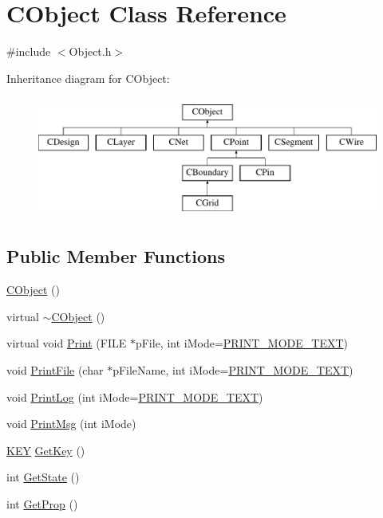 \hypertarget{classCObject}{}\section{C\+Object Class Reference}
\label{classCObject}


{\ttfamily \#include $<$Object.\+h$>$}

Inheritance diagram for C\+Object\+:\begin{figure}[H]
\begin{center}
\leavevmode
\includegraphics[height=4.000000cm]{classCObject}
\end{center}
\end{figure}
\subsection*{Public Member Functions}
\begin{DoxyCompactItemize}
\item 
\mbox{\hyperlink{classCObject_ac44111d5ac75248a616df61b038c4153}{C\+Object}} ()
\item 
virtual \mbox{\hyperlink{classCObject_a93a3c3bc7d9a6462ef00e25404d9b0eb}{$\sim$\+C\+Object}} ()
\item 
virtual void \mbox{\hyperlink{classCObject_a75afd905b2d14ed374c75d90f079a389}{Print}} (F\+I\+LE $\ast$p\+File, int i\+Mode=\mbox{\hyperlink{BoxRouter_8h_a57a837ae96ef88ba334045a535dd3b8e}{P\+R\+I\+N\+T\+\_\+\+M\+O\+D\+E\+\_\+\+T\+E\+XT}})
\item 
void \mbox{\hyperlink{classCObject_a6946fc7b7c10ee357b77dad0466650d2}{Print\+File}} (char $\ast$p\+File\+Name, int i\+Mode=\mbox{\hyperlink{BoxRouter_8h_a57a837ae96ef88ba334045a535dd3b8e}{P\+R\+I\+N\+T\+\_\+\+M\+O\+D\+E\+\_\+\+T\+E\+XT}})
\item 
void \mbox{\hyperlink{classCObject_aa98c9f97492a83c6397a7d8f98c63bba}{Print\+Log}} (int i\+Mode=\mbox{\hyperlink{BoxRouter_8h_a57a837ae96ef88ba334045a535dd3b8e}{P\+R\+I\+N\+T\+\_\+\+M\+O\+D\+E\+\_\+\+T\+E\+XT}})
\item 
void \mbox{\hyperlink{classCObject_a3bf81b5d5af59f8b8a6a716591d0f355}{Print\+Msg}} (int i\+Mode)
\item 
\mbox{\hyperlink{res2dmp_8cpp_a8ae9d53f33f46cfcfcb9736e6351452a}{K\+EY}} \mbox{\hyperlink{classCObject_af40e7f490ecf17319ce70f9b0ee723c7}{Get\+Key}} ()
\item 
int \mbox{\hyperlink{classCObject_a94f72fd4b4155dc18decb9d53f42dc99}{Get\+State}} ()
\item 
int \mbox{\hyperlink{classCObject_afc32a8e7c4450a95c2a6333d7e3319b4}{Get\+Prop}} ()
\end{DoxyCompactItemize}
